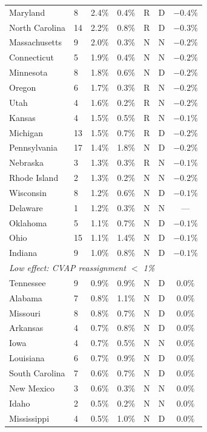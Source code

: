 \begin{longtable}{llccccc}
Maryland & 8 & 2.4\% & 0.4\% & R & D & $-0.4\%$ \\
North Carolina & 14 & 2.2\% & 0.8\% & R & D & $-0.3\%$ \\
Massachusetts & 9 & 2.0\% & 0.3\% & N & N & $-0.2\%$ \\
Connecticut & 5 & 1.9\% & 0.4\% & N & N & $-0.2\%$ \\
Minnesota & 8 & 1.8\% & 0.6\% & N & D & $-0.2\%$ \\
Oregon & 6 & 1.7\% & 0.3\% & R & N & $-0.2\%$ \\
Utah & 4 & 1.6\% & 0.2\% & R & N & $-0.2\%$ \\
Kansas & 4 & 1.5\% & 0.5\% & R & N & $-0.1\%$ \\
Michigan & 13 & 1.5\% & 0.7\% & R & D & $-0.2\%$ \\
Pennsylvania & 17 & 1.4\% & 1.8\% & N & D & $-0.2\%$ \\
Nebraska & 3 & 1.3\% & 0.3\% & R & N & $-0.1\%$ \\
Rhode Island & 2 & 1.3\% & 0.2\% & N & N & $-0.2\%$ \\
Wisconsin & 8 & 1.2\% & 0.6\% & N & D & $-0.1\%$ \\
Delaware & 1 & 1.2\% & 0.3\% & N & N & --- \\
Oklahoma & 5 & 1.1\% & 0.7\% & N & D & $-0.1\%$ \\
Ohio & 15 & 1.1\% & 1.4\% & N & D & $-0.1\%$ \\
Indiana & 9 & 1.0\% & 0.8\% & N & D & $-0.1\%$ \\
%
\multicolumn{7}{l}{\textit{Low effect: CVAP reassignment $<$ 1\%}} \\
Tennessee & 9 & 0.9\% & 0.9\% & N & D & $0.0\%$ \\
Alabama & 7 & 0.8\% & 1.1\% & N & D & $0.0\%$ \\
Missouri & 8 & 0.8\% & 0.7\% & N & D & $0.0\%$ \\
Arkansas & 4 & 0.7\% & 0.8\% & N & D & $0.0\%$ \\
Iowa & 4 & 0.7\% & 0.5\% & N & N & $0.0\%$ \\
Louisiana & 6 & 0.7\% & 0.9\% & N & D & $0.0\%$ \\
South Carolina & 7 & 0.6\% & 0.7\% & N & D & $0.0\%$ \\
New Mexico & 3 & 0.6\% & 0.3\% & N & N & $0.0\%$ \\
Idaho & 2 & 0.5\% & 0.2\% & N & N & $0.0\%$ \\
Mississippi & 4 & 0.5\% & 1.0\% & N & D & $0.0\%$ \\

\end{longtable}
